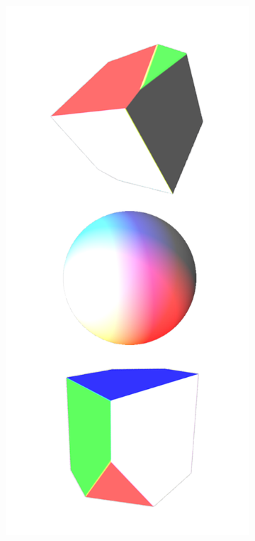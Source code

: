 \documentclass{l4proj}
\begin{document}
\begin{figure}
  \begin{subfigure}[b]{0.32\textwidth}
    \includegraphics[width=\textwidth]{images/textures/no-pattern-rgbw.png}

\end{subfigure}
\end{figure}
\end{document}
